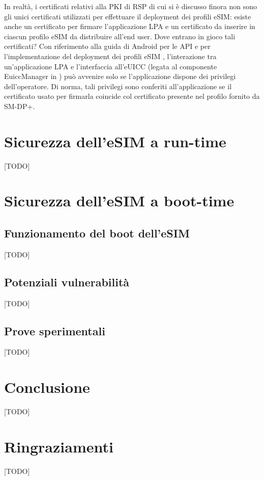 \documentclass[10pt, twoside, openany]{book}
\begin{document}
In realtà, i certificati relativi alla PKI di RSP di cui si è discusso finora non sono gli unici certificati utilizzati per effettuare il deployment dei profili eSIM: esiste anche un certificato per firmare l'applicazione LPA e un certificato da inserire in ciascun profilo eSIM da distribuire all'end user. Dove entrano in gioco tali certificati? Con riferimento alla guida di Android per le API e per l'implementazione del deployment dei profili eSIM \cite{Android-docs}, l'interazione tra un'applicazione LPA e l'interfaccia all'eUICC (legata al componente EuiccManager in \cite{Android-docs}) può avvenire solo se l'applicazione dispone dei privilegi dell'operatore. Di norma, tali privilegi sono conferiti all'applicazione se il certificato usato per firmarla coincide col certificato presente nel profilo fornito da SM-DP+.

\chapter{Sicurezza dell'eSIM a run-time}
[TODO]

\chapter{Sicurezza dell'eSIM a boot-time}
\section{Funzionamento del boot dell'eSIM}
[TODO]

\section{Potenziali vulnerabilità}
[TODO]

\section{Prove sperimentali}
[TODO]

\chapter{Conclusione}
[TODO]



\chapter*{Ringraziamenti}
[TODO]
\end{document}
